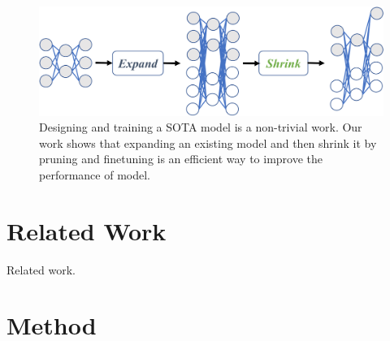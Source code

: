 \documentclass[10pt,twocolumn,letterpaper]{article}
\begin{document}
\begin{figure}[t]
  \centering
   \includegraphics[width=0.8\linewidth]{../expandandshrink.pdf}

   \caption{Designing and training a SOTA model is a non-trivial work. Our work shows that expanding an existing model and then shrink it by pruning and finetuning is an efficient way to improve the performance of model.}
   \label{fig:overview}
\end{figure}



\section{Related Work}
\label{sec:related}

Related work.


\section{Method}
\label{sec:method}
\end{document}
